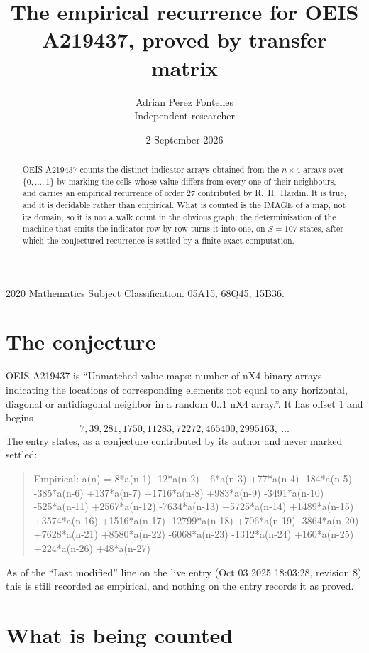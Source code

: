 \documentclass[11pt,a4paper]{article}
\title{The empirical recurrence for OEIS A219437, proved by transfer matrix}
\author{Adrian Perez Fontelles\\ \small Independent researcher}
\date{2 September 2026}
\theoremstyle{plain}
\theoremstyle{definition}
\begin{document}
\maketitle

\begin{abstract}
OEIS A219437 counts the distinct indicator arrays obtained from the $n\times4$ arrays over
$\{0,\dots,1\}$ by marking the cells whose value differs from every one of their neighbours, and carries an
empirical recurrence of order $27$ contributed by R.~H.~Hardin. It is true, and it is
decidable rather than empirical. What is counted is the IMAGE of a map, not its domain, so it
is not a walk count in the obvious graph; the determinisation of the machine that emits the
indicator row by row turns it into one, on $S=107$ states, after which the conjectured
recurrence is settled by a finite exact computation.
\end{abstract}

\noindent\small 2020 Mathematics Subject Classification. 05A15, 68Q45, 15B36.\normalsize

\section{The conjecture}

OEIS A219437 is ``Unmatched value maps: number of nX4 binary arrays indicating the locations of corresponding elements not equal to any horizontal, diagonal or antidiagonal neighbor in a random 0..1 nX4 array.''. It has offset $1$ and begins
\[
7, 39, 281, 1750, 11283, 72272, 465400, 2995163,\ \dots
\]
The entry states, as a conjecture contributed by its author and never marked settled:
\begin{quote}
Empirical: a(n) = 8*a(n-1) -12*a(n-2) +6*a(n-3) +77*a(n-4) -184*a(n-5) -385*a(n-6) +137*a(n-7) +1716*a(n-8) +983*a(n-9) -3491*a(n-10) -525*a(n-11) +2567*a(n-12) -7634*a(n-13) +5725*a(n-14) +1489*a(n-15) +3574*a(n-16) +1516*a(n-17) -12799*a(n-18) +706*a(n-19) -3864*a(n-20) +7628*a(n-21) +8580*a(n-22) -6068*a(n-23) -1312*a(n-24) +160*a(n-25) +224*a(n-26) +48*a(n-27)
\end{quote}
As of the ``Last modified'' line on the live entry (Oct 03 2025 18:03:28, revision 8) this is still
recorded as empirical, and nothing on the entry records it as proved.

\section{What is being counted}
\end{document}

